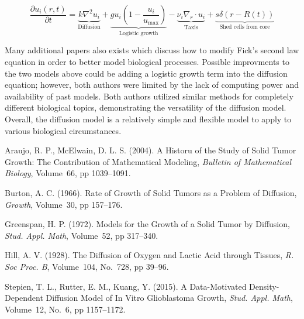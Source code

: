 \documentclass{article}
\begin{document}
\begin{equation}
    \frac{\partial u_i(r, t)}{\partial t} = \underset{\text{Diffusion}}{\underbrace{k \nabla^2 u_i}} + \underset{\text{Logistic growth}}{\underbrace{g u_i \left(1 - \frac{u_i}{u_{\max}}\right)}} - \underset{\text{Taxis}}{\underbrace{\nu_i \nabla_r \cdot u_i}} + \underset{\text{Shed cells from core}}{\underbrace{s \delta(r - R(t))}}
\end{equation}

Many additional papers also exists which discuss how to modify Fick's second law equation in order to better model biological processes. Possible improvments to the two models above could be adding a logistic growth term into the diffusion equation; however, both authors
were limited by the lack of computing power and availability of past models. Both authors utilized similar methods for completely different
biological topics, demonstrating the versatility of the diffusion model. Overall, the diffusion model is a relatively simple and flexible model to apply to
various biological circumstances.

\begin{thebibliography}{99}

    
    Araujo, R. P., McElwain, D. L. S. (2004).
    \newblock A Historu of the Study of Solid Tumor Growth: The Contribution of Mathematical Modeling,
    \newblock \emph{Bulletin of Mathematical Biology},
    \newblock Volume~66, pp 1039--1091.

    Burton, A. C. (1966).
    \newblock Rate of Growth of Solid Tumors as a Problem of Diffusion,
    \newblock \emph{Growth},
    \newblock Volume~30, pp 157--176.

    Greenspan, H. P. (1972).
    \newblock Models for the Growth of a Solid Tumor by Diffusion,
    \newblock \emph{Stud. Appl. Math},
    \newblock Volume~52, pp 317--340.

    Hill, A. V. (1928).
    \newblock The Diffusion of Oxygen and Lactic Acid through Tissues,
    \newblock \emph{R. Soc Proc. B},
    \newblock Volume~104, No.~728, pp 39--96.

    Stepien, T. L., Rutter, E. M., Kuang, Y. (2015).
    \newblock A Data-Motivated Density-Dependent Diffusion Model of In Vitro Glioblastoma Growth,
    \newblock \emph{Stud. Appl. Math},
    \newblock Volume~12, No.~6, pp 1157--1172.


\end{thebibliography}
\end{document}
